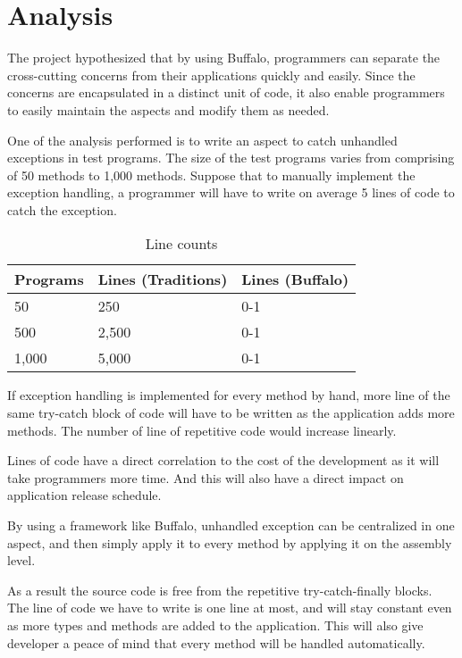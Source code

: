 \chapter{Analysis}

The project hypothesized that by using Buffalo, programmers can separate the cross-cutting concerns from their applications quickly and easily. Since the concerns are encapsulated in a distinct unit of code, it also enable programmers to easily maintain the aspects and modify them as needed.

One of the analysis performed is to write an aspect to catch unhandled exceptions in test programs. The size of the test programs varies from comprising of 50 methods to 1,000 methods. Suppose that to manually implement the exception handling, a programmer will have to write on average 5 lines of code to catch the exception.

\begin{table}[H]
\centering
\begin{tabular}{|l|l|l|}
\hline
Programs & Lines (Traditions) & Lines (Buffalo)\\
\hline
50 & 250 & 0-1\\
500 & 2,500 & 0-1\\
1,000 & 5,000 & 0-1\\
\hline
\end{tabular}
\caption{Line counts}
\label{tab:lines_tbl}
\end{table}

If exception handling is implemented for every method by hand, more line of the same try-catch block of code will have to be written as the application adds more methods. The number of line of repetitive code would increase linearly.

Lines of code have a direct correlation to the cost of the development as it will take programmers more time. And this will also have a direct impact on application release schedule.

By using a framework like Buffalo, unhandled exception can be centralized in one aspect, and then simply apply it to every method by applying it on the assembly level. 

As a result the source code is free from the repetitive try-catch-finally blocks. The line of code we have to write is one line at most, and will stay constant even as more types and methods are added to the application. This will also give developer a peace of mind that every method will be handled automatically.


